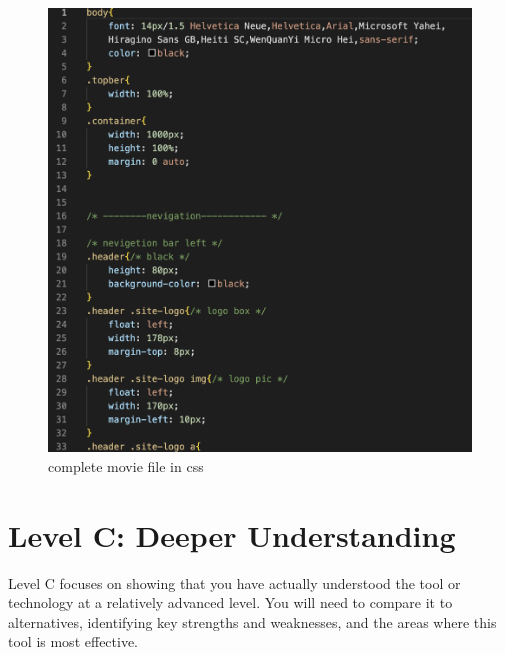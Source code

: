 \documentclass[a4paper, 11pt]{report}
\begin{document}
\begin{figure}
\includegraphics[width=1\linewidth]{movie file css.png}
\caption{\label{movie file css.png}complete movie file in css}
\end{figure}




\newpage
\section{Level C: Deeper Understanding}

Level C focuses on showing that you have actually understood the tool or technology at a relatively advanced level. You will need to compare it to alternatives, identifying key strengths and weaknesses, and the areas where this tool is most effective. 
\end{document}
